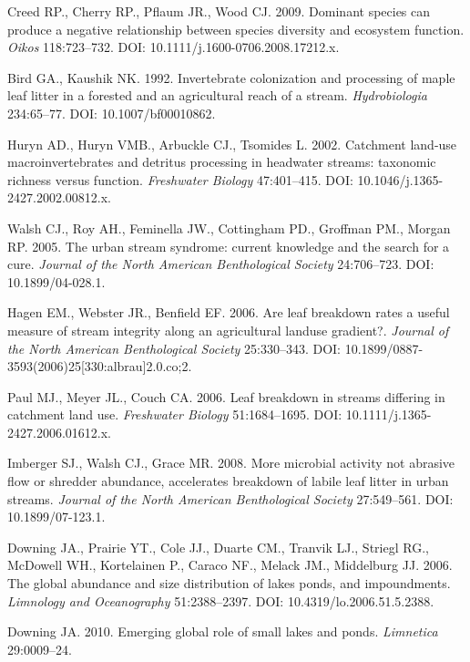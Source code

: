 \documentclass[12pt,letter]{article}
\begin{document}
\label{csl:19}Creed RP., Cherry RP., Pflaum JR., Wood CJ. 2009. {Dominant species can produce a negative relationship between species diversity and ecosystem function}. \textit{Oikos} 118:723–732. DOI: 10.1111/j.1600-0706.2008.17212.x.

\label{csl:20}Bird GA., Kaushik NK. 1992. {Invertebrate colonization and processing of maple leaf litter in a forested and an agricultural reach of a stream}. \textit{Hydrobiologia} 234:65–77. DOI: 10.1007/bf00010862.

\label{csl:21}Huryn AD., Huryn VMB., Arbuckle CJ., Tsomides L. 2002. {Catchment land-use macroinvertebrates and detritus processing in headwater streams: taxonomic richness versus function}. \textit{Freshwater Biology} 47:401–415. DOI: 10.1046/j.1365-2427.2002.00812.x.

\label{csl:22}Walsh CJ., Roy AH., Feminella JW., Cottingham PD., Groffman PM., Morgan RP. 2005. {The urban stream syndrome: current knowledge and the search for a cure}. \textit{Journal of the North American Benthological Society} 24:706–723. DOI: 10.1899/04-028.1.

\label{csl:23}Hagen EM., Webster JR., Benfield EF. 2006. {Are leaf breakdown rates a useful measure of stream integrity along an agricultural landuse gradient?}. \textit{Journal of the North American Benthological Society} 25:330–343. DOI: 10.1899/0887-3593(2006)25[330:albrau]2.0.co;2.

\label{csl:24}Paul MJ., Meyer JL., Couch CA. 2006. {Leaf breakdown in streams differing in catchment land use}. \textit{Freshwater Biology} 51:1684–1695. DOI: 10.1111/j.1365-2427.2006.01612.x.

\label{csl:25}Imberger SJ., Walsh CJ., Grace MR. 2008. {More microbial activity not abrasive flow or shredder abundance, accelerates breakdown of labile leaf litter in urban streams}. \textit{Journal of the North American Benthological Society} 27:549–561. DOI: 10.1899/07-123.1.

\label{csl:26}Downing JA., Prairie YT., Cole JJ., Duarte CM., Tranvik LJ., Striegl RG., McDowell WH., Kortelainen P., Caraco NF., Melack JM., Middelburg JJ. 2006. {The global abundance and size distribution of lakes ponds, and impoundments}. \textit{Limnology and Oceanography} 51:2388–2397. DOI: 10.4319/lo.2006.51.5.2388.

\label{csl:27}Downing JA. 2010. {Emerging global role of small lakes and ponds}. \textit{Limnetica} 29:0009–24.
\end{document}

